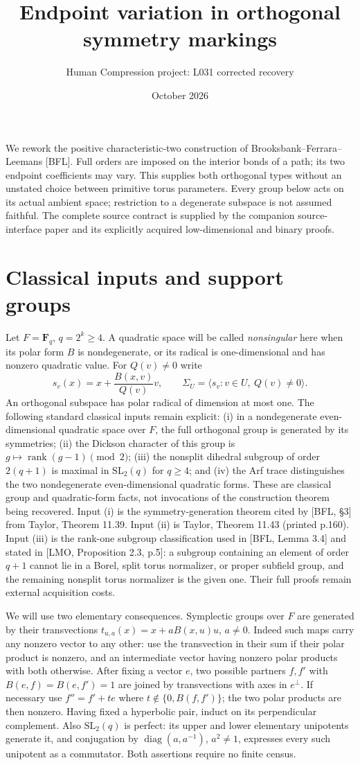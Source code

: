 \documentclass[11pt,a4paper]{article}
\title{Endpoint variation in orthogonal symmetry markings}
\author{Human Compression project: L031 corrected recovery}
\date{October 2026}
\newcommand{\gen}[1]{\langle#1\rangle}
\newcommand{\F}{\mathbf F}
\begin{document}
\maketitle
We rework the positive characteristic-two construction of
Brooksbank--Ferrara--Leemans [BFL]. Full orders are imposed on the
interior bonds of a path; its two endpoint coefficients may vary.
This supplies both orthogonal types without an unstated choice between
primitive torus parameters. Every group below acts on its actual
ambient space; restriction to a degenerate subspace is not assumed
faithful. The complete source contract is supplied by the companion source-interface
paper and its explicitly acquired low-dimensional and binary proofs.

\section{Classical inputs and support groups}
Let $F=\F_q$, $q=2^k\geq4$. A quadratic space will be called
\emph{nonsingular} here when its polar form $B$ is nondegenerate,
or its radical is one-dimensional and has nonzero quadratic value.
For $Q(v)\ne0$ write
\[
 s_v(x)=x+\frac{B(x,v)}{Q(v)}v,\qquad
 \Sigma_U=\gen{s_v:v\in U,\ Q(v)\ne0}.
\]
An orthogonal subspace has polar radical of dimension at most one.
The following standard classical inputs remain explicit:
(i) in a nondegenerate even-dimensional quadratic space over $F$,
the full orthogonal group is generated by its symmetries;
(ii) the Dickson character of this group is
$g\mapsto\operatorname{rank}(g-1)\pmod2$;
(iii) the nonsplit dihedral subgroup of order $2(q+1)$ is maximal
in $\mathrm{SL}_2(q)$ for $q\geq4$; and
(iv) the Arf trace distinguishes the two nondegenerate even-dimensional
quadratic forms. These are classical group and quadratic-form facts,
not invocations of the construction theorem being recovered.
Input (i) is the symmetry-generation theorem cited by [BFL, \S3]
from Taylor, Theorem 11.39. Input (ii) is Taylor, Theorem 11.43 (printed p.160).
Input (iii) is the rank-one subgroup classification used in
[BFL, Lemma 3.4] and stated in [LMO, Proposition 2.3, p.5]: a subgroup containing an element of order $q+1$
cannot lie in a Borel, split torus normalizer, or proper subfield
group, and the remaining nonsplit torus normalizer is the given one.
Their full proofs remain external acquisition costs.

We will use two elementary consequences. Symplectic groups over $F$
are generated by their transvections
$t_{u,a}(x)=x+aB(x,u)u$, $a\ne0$.
Indeed such maps carry any nonzero vector to any other: use the
transvection in their sum if their polar product is nonzero, and an
intermediate vector having nonzero polar products with both otherwise.
After fixing a vector $e$, two possible partners $f,f'$ with
$B(e,f)=B(e,f')=1$ are joined by transvections with axes in $e^\perp$.
If necessary use $f''=f'+te$ where
$t\notin\{0,B(f,f')\}$; the two polar products are then nonzero.
Having fixed a hyperbolic pair, induct on its perpendicular complement.
Also $\mathrm{SL}_2(q)$ is perfect: its upper and lower elementary
unipotents generate it, and conjugation by
$\operatorname{diag}(a,a^{-1})$, $a^2\ne1$, expresses every such
unipotent as a commutator. Both assertions require no finite census.
\end{document}
